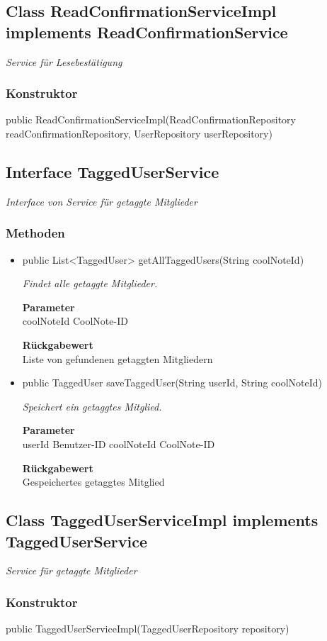 \documentclass[a4paper]{scrreprt}
\begin{document}
    \subsection{Class ReadConfirmationServiceImpl implements ReadConfirmationService}
    \textit{Service für Lesebestätigung}
    \subsubsection{Konstruktor}
    public ReadConfirmationServiceImpl(ReadConfirmationRepository readConfirmationRepository, UserRepository userRepository)
    \subsection{Interface TaggedUserService}
    \textit{Interface von Service für getaggte Mitglieder}
    \subsubsection{Methoden}
    \begin{itemize}
    	\item{public List<TaggedUser> getAllTaggedUsers(String coolNoteId)}
    	
    	\textit{Findet alle getaggte Mitglieder.}
    	
    	\textbf{Parameter} \\
    	coolNoteId CoolNote-ID
    	
    	\textbf{Rückgabewert} \\
    	Liste von gefundenen getaggten Mitgliedern        \item{public TaggedUser saveTaggedUser(String userId, String coolNoteId)}
    	
    	\textit{Speichert ein getaggtes Mitglied.}
    	
    	\textbf{Parameter} \\
    	userId Benutzer-ID
    	coolNoteId CoolNote-ID
    	
    	\textbf{Rückgabewert} \\
    	Gespeichertes getaggtes Mitglied
    \end{itemize}
    \subsection{Class TaggedUserServiceImpl implements TaggedUserService}
    \textit{Service für getaggte Mitglieder}
    \subsubsection{Konstruktor}
    public TaggedUserServiceImpl(TaggedUserRepository repository)
\end{document}
